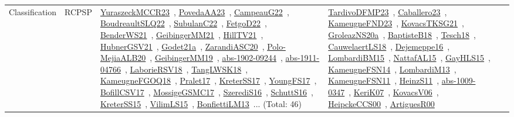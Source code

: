 {\begin{longtable}{lp{3cm}>{\raggedright\arraybackslash}p{6cm}>{\raggedright\arraybackslash}p{6cm}>{\raggedright\arraybackslash}p{8cm}}
Classification & RCPSP & \href{works/YuraszeckMCCR23.pdf}{YuraszeckMCCR23}~\cite{YuraszeckMCCR23}, \href{works/PovedaAA23.pdf}{PovedaAA23}~\cite{PovedaAA23}, \href{works/CampeauG22.pdf}{CampeauG22}~\cite{CampeauG22}, \href{works/BoudreaultSLQ22.pdf}{BoudreaultSLQ22}~\cite{BoudreaultSLQ22}, \href{works/SubulanC22.pdf}{SubulanC22}~\cite{SubulanC22}, \href{works/FetgoD22.pdf}{FetgoD22}~\cite{FetgoD22}, \href{works/BenderWS21.pdf}{BenderWS21}~\cite{BenderWS21}, \href{works/GeibingerMM21.pdf}{GeibingerMM21}~\cite{GeibingerMM21}, \href{works/HillTV21.pdf}{HillTV21}~\cite{HillTV21}, \href{works/HubnerGSV21.pdf}{HubnerGSV21}~\cite{HubnerGSV21}, \href{works/Godet21a.pdf}{Godet21a}~\cite{Godet21a}, \href{works/ZarandiASC20.pdf}{ZarandiASC20}~\cite{ZarandiASC20}, \href{works/Polo-MejiaALB20.pdf}{Polo-MejiaALB20}~\cite{Polo-MejiaALB20}, \href{works/GeibingerMM19.pdf}{GeibingerMM19}~\cite{GeibingerMM19}, \href{works/abs-1902-09244.pdf}{abs-1902-09244}~\cite{abs-1902-09244}, \href{works/abs-1911-04766.pdf}{abs-1911-04766}~\cite{abs-1911-04766}, \href{works/LaborieRSV18.pdf}{LaborieRSV18}~\cite{LaborieRSV18}, \href{works/TangLWSK18.pdf}{TangLWSK18}~\cite{TangLWSK18}, \href{works/KameugneFGOQ18.pdf}{KameugneFGOQ18}~\cite{KameugneFGOQ18}, \href{works/Pralet17.pdf}{Pralet17}~\cite{Pralet17}, \href{works/KreterSS17.pdf}{KreterSS17}~\cite{KreterSS17}, \href{works/YoungFS17.pdf}{YoungFS17}~\cite{YoungFS17}, \href{works/BofillCSV17.pdf}{BofillCSV17}~\cite{BofillCSV17}, \href{works/MossigeGSMC17.pdf}{MossigeGSMC17}~\cite{MossigeGSMC17}, \href{works/SzerediS16.pdf}{SzerediS16}~\cite{SzerediS16}, \href{works/SchuttS16.pdf}{SchuttS16}~\cite{SchuttS16}, \href{works/KreterSS15.pdf}{KreterSS15}~\cite{KreterSS15}, \href{works/VilimLS15.pdf}{VilimLS15}~\cite{VilimLS15}, \href{works/BonfiettiLM13.pdf}{BonfiettiLM13}~\cite{BonfiettiLM13}... (Total: 46) & \href{works/TardivoDFMP23.pdf}{TardivoDFMP23}~\cite{TardivoDFMP23}, \href{works/Caballero23.pdf}{Caballero23}~\cite{Caballero23}, \href{works/KameugneFND23.pdf}{KameugneFND23}~\cite{KameugneFND23}, \href{works/KovacsTKSG21.pdf}{KovacsTKSG21}~\cite{KovacsTKSG21}, \href{works/GroleazNS20a.pdf}{GroleazNS20a}~\cite{GroleazNS20a}, \href{works/BaptisteB18.pdf}{BaptisteB18}~\cite{BaptisteB18}, \href{works/Tesch18.pdf}{Tesch18}~\cite{Tesch18}, \href{works/CauwelaertLS18.pdf}{CauwelaertLS18}~\cite{CauwelaertLS18}, \href{works/Dejemeppe16.pdf}{Dejemeppe16}~\cite{Dejemeppe16}, \href{works/LombardiBM15.pdf}{LombardiBM15}~\cite{LombardiBM15}, \href{works/NattafAL15.pdf}{NattafAL15}~\cite{NattafAL15}, \href{works/GayHLS15.pdf}{GayHLS15}~\cite{GayHLS15}, \href{works/KameugneFSN14.pdf}{KameugneFSN14}~\cite{KameugneFSN14}, \href{works/LombardiM13.pdf}{LombardiM13}~\cite{LombardiM13}, \href{works/KameugneFSN11.pdf}{KameugneFSN11}~\cite{KameugneFSN11}, \href{works/HeinzS11.pdf}{HeinzS11}~\cite{HeinzS11}, \href{works/abs-1009-0347.pdf}{abs-1009-0347}~\cite{abs-1009-0347}, \href{works/KeriK07.pdf}{KeriK07}~\cite{KeriK07}, \href{works/KovacsV06.pdf}{KovacsV06}~\cite{KovacsV06}, \href{works/HeipckeCCS00.pdf}{HeipckeCCS00}~\cite{HeipckeCCS00}, \href{works/ArtiguesR00.pdf}{ArtiguesR00}~\cite{ArtiguesR00} & 
\end{longtable}}
